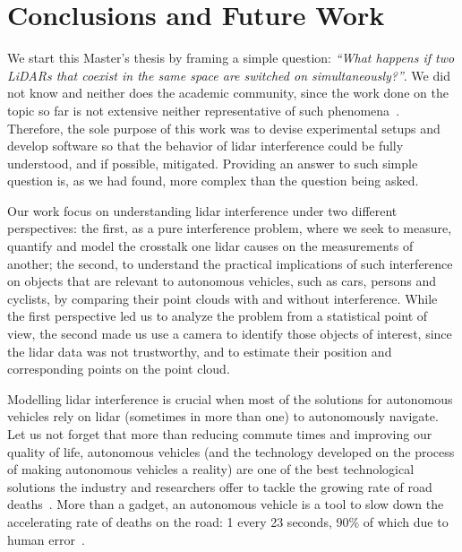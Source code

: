 \chapter{Conclusions and Future Work}
\label{chapter:conclusion}

We start this Master's thesis by framing a simple question: \textit{``What happens if two LiDARs that coexist in the same space are switched on simultaneously?''}. We did not know and neither does the academic community, since the work done on the topic so far is not extensive neither representative of such phenomena~\cite{Kim2015a, Kim2015b, Kim2015c, Kim2017, Popko2019a, Popko2019b}. Therefore, the sole purpose of this work was to devise experimental setups and develop software so that the behavior of \ac{lidar} interference could be fully understood, and if possible, mitigated. Providing an answer to such simple question is, as we had found, more complex than the question being asked.

Our work focus on understanding \ac{lidar} interference under two different perspectives: the first, as a pure interference problem, where we seek to measure, quantify and model the crosstalk one \ac{lidar} causes on the measurements of another; the second, to understand the practical implications of such interference on objects that are relevant to autonomous vehicles, such as cars, persons and cyclists, by comparing their point clouds with and without interference. While the first perspective led us to analyze the problem from a statistical point of view, the second made us use a camera to identify those objects of interest, since the \ac{lidar} data was not trustworthy, and to estimate their position and corresponding points on the point cloud. 

Modelling \ac{lidar} interference is crucial when most of the solutions for autonomous vehicles rely on \ac{lidar} (sometimes in more than one) to autonomously navigate. Let us not forget that more than reducing commute times and improving our quality of life, autonomous vehicles (and the technology developed on the process of making autonomous vehicles a reality) are one of the best technological solutions the industry and researchers offer to tackle the growing rate of road deaths~\cite{WHO2018}. More than a gadget, an autonomous vehicle is a tool to slow down the accelerating rate of deaths on the road: 1 every 23 seconds, 90\% of which due to human error~\cite{WHO2018, WHOvisualizer}.

